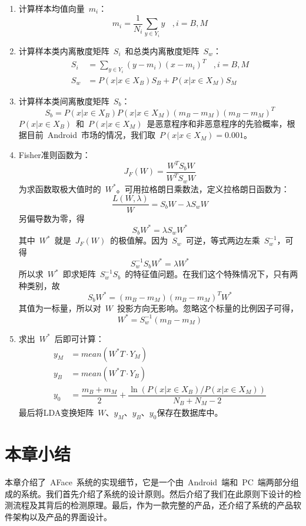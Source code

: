 \begin{enumerate}
		\begin{enumerate}
		\item 计算样本均值向量~$m_i$：
		\begin{equation*}
		m_i=\dfrac{1}{N_i}\sum_{y \in Y_i}y ~~~~,i=B,M
		\end{equation*}
		\item 计算样本类内离散度矩阵~$S_i$~和总类内离散度矩阵~$S_w$：
		\begin{align}
		S_i & = \sum_{y \in Y_i}(y-m_i)(x-m_i)^T ~~~~,i=B,M\\
		S_w & = P(x|x \in X_B)S_B + P(x|x\in X_M)S_M
		\end{align}
		\item 计算样本类间离散度矩阵~$S_b$：
		\begin{equation*}
		S_b=P(x|x \in X_B)P(x|x\in X_M)(m_B-m_M)(m_B-m_M)^T
		\end{equation*}
		$P(x|x \in X_B)$~和~$P(x|x\in X_M)$~是恶意程序和非恶意程序的先验概率，根据目前~Android~市场的情况，我们取~$P(x|x\in X_M)=0.001$。
		\item Fisher准则函数为：
		\begin{equation}
		J_F(W) = \dfrac{W^T S_b W}{W^T S_w W}
		\end{equation}
		 为求函数取极大值时的~$W^*$。可用拉格朗日乘数法，定义拉格朗日函数为：
		\begin{equation*}
		\dfrac{L(W,\lambda)}{W} = S_bW-\lambda S_w W
		\end{equation*}
		另偏导数为零，得
		\begin{equation*}
		S_b W^* = \lambda S_w W^*
		\end{equation*}
		 其中~$W^*$~就是~$J_F(W)$~的极值解。因为~$S_w$~可逆，等式两边左乘~$S_w^{-1}$，可得
		\begin{equation*}
		S_w^{-1} S_b W^* = \lambda W^*
		\end{equation*}
		所以求~$W^*$~即求矩阵~$S_w^{-1} S_b$~的特征值问题。在我们这个特殊情况下，只有两种类别，故
		\begin{equation*}
		S_b W^* = (m_B-m_M)(m_B-m_M)^T W^*
		\end{equation*}
		 其值为一标量，所以对~$W$~投影方向无影响。忽略这个标量的比例因子可得，
		\begin{equation*}
		W^* = S_w^{-1} (m_B-m_M)
		\end{equation*}
		\item 求出~$W^*$~后即可计算：
		\begin{align}
		y_M & = mean(W^*T \cdot Y_M) \\
		y_B & = mean(W^*T \cdot Y_B) \\
		y_0 & = \dfrac{m_B+m_M}{2}  +  \dfrac{\ln (P(x|x\in X_B)/P(x|x\in X_M))}{N_B+N_M-2}
		\end{align}
		 最后将LDA变换矩阵~$W$、$y_M$、$y_B$、$y_0$保存在数据库中。
		\end{enumerate}
		\end{enumerate}
\section{本章小结}
本章介绍了~AFace~系统的实现细节，它是一个由~Android~端和~PC~端两部分组成的系统。我们首先介绍了系统的设计原则。然后介绍了我们在此原则下设计的检测流程及其背后的检测原理。最后，作为一款完整的产品，还介绍了系统的产品软件架构以及产品的界面设计。
